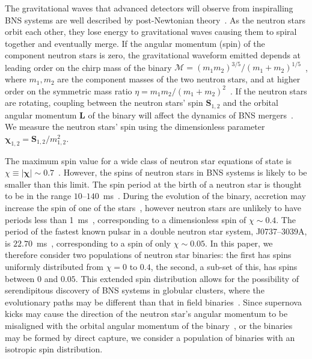 The gravitational waves that advanced detectors will observe from inspiralling BNS systems
are well described by post-Newtonian theory~\cite{Blanchet:2006zz}.
As the neutron stars orbit each other, they lose energy to gravitational waves
causing them to spiral together and eventually merge.
If the
angular momentum (spin) of the component neutron stars is zero, the gravitational
waveform emitted depends at leading order on the chirp mass of the binary
$\mathcal{M} = \left(m_1 m_2\right)^{3/5}/\left( m_1 +
m_2\right)^{1/5}$~\cite{Peters:1963ux}, where $m_1,m_2$ are the component masses
of the two neutron stars, and at higher order on the symmetric
mass ratio $\eta = m_1 m_2 /
(m_1+m_2)^2$~\cite{Blanchet:1995fg,Blanchet:1995ez,BIWW96,Wi93,BFIJ02,Blanchet:2004ek}.
If the neutron stars are rotating, 
coupling between the neutron stars' spin $\bm{S}_{1,2}$ and the
orbital angular momentum $\bm{L}$ of the binary will affect the dynamics of BNS
mergers~\cite{Kidder:1992fr,Apostolatos:1994mx,Kidder:1995zr,Blanchet:2006gy}.  
We measure the neutron stars' spin using the dimensionless parameter
$\bm{\chi}_{1,2} = {\bm{S}_{1,2}}/{m_{1,2}^2}$.

The maximum spin value for a wide class of neutron star equations of state is
$\chi \equiv \left| \bm{\chi} \right| \sim 0.7$~\cite{Lo:2010bj}. However, the spins of neutron stars in BNS
systems is likely to be smaller than this limit. The spin period at the birth
of a neutron star is thought to be in the range
$10$--$140$~ms~\cite{Lorimer:2008se,Mandel:2009nx}. During the evolution of
the binary, accretion may increase the spin of one of the
stars~\cite{Bildsten:1997vw}, however neutron stars are unlikely to have
periods less than 1~ms~\cite{Chakrabarty:2008gz}, corresponding to a
dimensionless spin of $\chi \sim 0.4$.  The period of the fastest known pulsar
in a double neutron star system, J0737--3039A, is
$22.70$~ms~\cite{Burgay:2003jj}, corresponding to a spin of only $\chi \sim
0.05$. In this paper, we therefore consider two populations of neutron star
binaries: the first has spins uniformly distributed from $\chi = 0$ to $0.4$,
the second, a sub-set of this, has spins between $0$ and $0.05$.  This extended spin
distribution allows for the possibility of serendipitous discovery of BNS
systems in globular clusters, where the evolutionary paths may be different
than that in field binaries~\cite{Grindlay:2005ym}. Since supernova kicks may
cause the direction of the neutron star's angular momentum to be misaligned
with the orbital angular momentum of the binary~\cite{Farr:2011gs}, or the
binaries may be formed by direct capture, we consider  a population of
binaries with an isotropic spin distribution.

